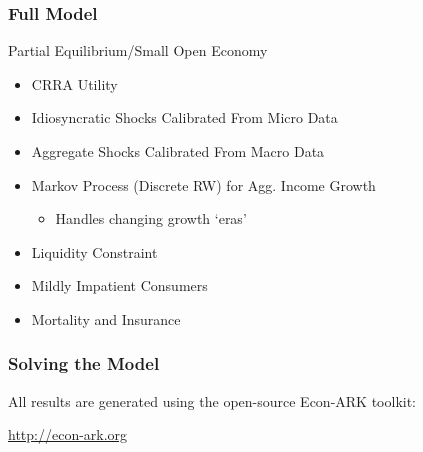 \documentclass{beamer}\usepackage{dcolumn}
\begin{document}
\begin{frame}
\frametitle{Full Model}

\begin{block}{Partial Equilibrium/Small Open Economy}
\begin{itemize}
\item  CRRA Utility
\item  Idiosyncratic Shocks Calibrated From Micro Data
\item  Aggregate Shocks Calibrated From Macro Data
\item Markov Process (Discrete RW) for Agg. Income Growth
  \begin{itemize}
  \item Handles changing growth `eras'
  \end{itemize}
\item  Liquidity Constraint
\item  Mildly Impatient Consumers
\item  \cite{blanchardFinite} Mortality and Insurance
\end{itemize}
\end{block}

\end{frame}

\begin{frame}
\frametitle{Solving the Model}

All results are generated using the open-source Econ-ARK toolkit:
\bi
\item \url{http://econ-ark.org}
\ei

\end{frame}
\end{document}
